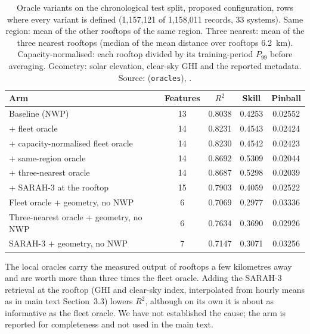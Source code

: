 \begin{table}[H]
\centering
\caption{Oracle variants on the chronological test split, proposed configuration, rows where every variant is defined (1,157,121 of 1,158,011 records, 33 systems). Same region: mean of the other rooftops of the same region. Three nearest: mean of the three nearest rooftops (median of the mean distance over rooftops 6.2~km). Capacity-normalised: each rooftop divided by its training-period $P_{99}$ before averaging. Geometry: solar elevation, clear-sky GHI and the reported metadata. Source:  (\texttt{oracles}), .}
\label{tab:s-oracles}
\small
\begin{tabularx}{\textwidth}{@{}X c c c c@{}}
\toprule
Arm & Features & $R^2$ & Skill & Pinball \\
\midrule
Baseline (NWP) & 13 & 0.8038 & 0.4253 & 0.02552 \\
+ fleet oracle & 14 & 0.8231 & 0.4543 & 0.02424 \\
+ capacity-normalised fleet oracle & 14 & 0.8230 & 0.4542 & 0.02423 \\
+ same-region oracle & 14 & 0.8692 & 0.5309 & 0.02044 \\
+ three-nearest oracle & 14 & 0.8687 & 0.5298 & 0.02039 \\
+ SARAH-3 at the rooftop & 15 & 0.7903 & 0.4059 & 0.02522 \\
Fleet oracle + geometry, no NWP & 6 & 0.7069 & 0.2977 & 0.03336 \\
Three-nearest oracle + geometry, no NWP & 6 & 0.7634 & 0.3690 & 0.02926 \\
SARAH-3 + geometry, no NWP & 7 & 0.7147 & 0.3071 & 0.03256 \\
\bottomrule
\end{tabularx}
\end{table}

The local oracles carry the measured output of rooftops a few kilometres away and are worth more than three times the fleet oracle. Adding the SARAH-3 retrieval at the rooftop (GHI and clear-sky index, interpolated from hourly means as in main text Section~3.3) lowers $R^2$, although on its own it is about as informative as the fleet oracle. We have not established the cause; the arm is reported for completeness and not used in the main text.

